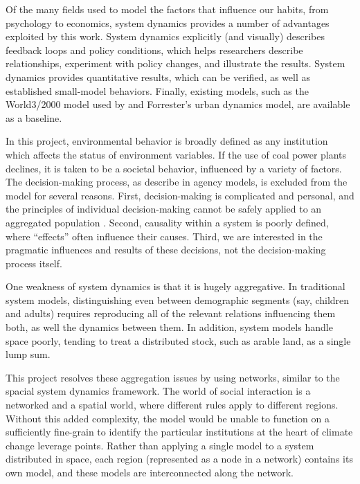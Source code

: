 \documentclass[12pt, oneside]{amsart}
\begin{document}
Of the many fields used to model the factors that influence our habits, from psychology to economics, system dynamics provides a number of advantages exploited by this work.  System dynamics explicitly (and visually) describes feedback loops and policy conditions, which helps researchers describe relationships, experiment with policy changes, and illustrate the results.  System dynamics provides quantitative results, which can be verified, as well as established small-model behaviors.  Finally, existing models, such as the World3/2000 model used by \citeauthor{meadows2004limits} and Forrester's urban dynamics model, are available as a baseline.

In this project, environmental behavior is broadly defined as any institution which affects the status of environment variables.  If the use of coal power plants declines, it is taken to be a societal behavior, influenced by a variety of factors.  The decision-making process, as describe in agency models, is excluded from the model for several reasons.  First, decision-making is complicated and personal, and the principles of individual decision-making cannot be safely applied to an aggregated population \citep{may1954intransitivity}.  Second, causality within a system is poorly defined, where ``effects'' often influence their causes.  Third, we are interested in the pragmatic influences and results of these decisions, not the decision-making process itself.

One weakness of system dynamics is that it is hugely aggregative.  In traditional system models, distinguishing even between demographic segments (say, children and adults) requires reproducing all of the relevant relations influencing them both, as well the dynamics between them.  In addition, system models handle space poorly, tending to treat a distributed stock, such as arable land, as a single lump sum.

This project resolves these aggregation issues by using networks, similar to the spacial system dynamics framework.  The world of social interaction is a networked and a spatial world, where different rules apply to different regions.  Without this added complexity, the model would be unable to function on a sufficiently fine-grain to identify the particular institutions at the heart of climate change leverage points.  Rather than applying a single model to a system distributed in space, each region (represented as a node in a network) contains its own model, and these models are interconnected along the network.
\end{document}

